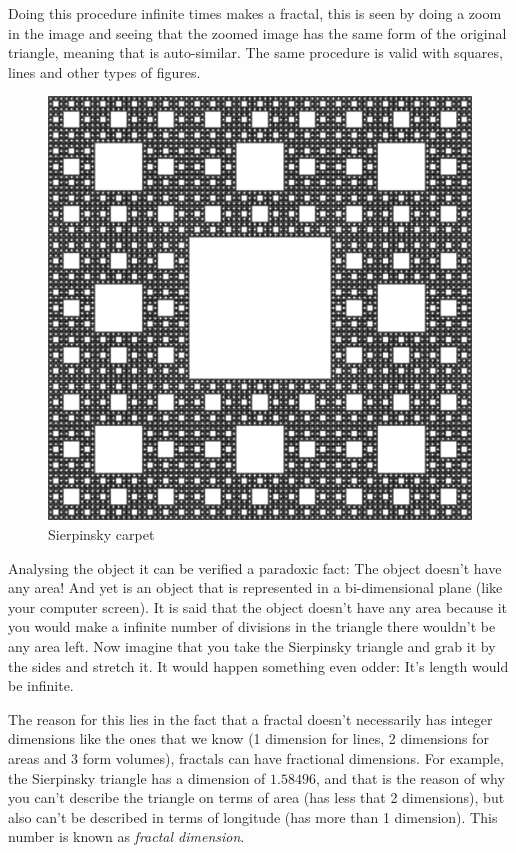\documentclass[oneside]{book}
\begin{document}
Doing this procedure infinite times makes a fractal, this is seen by doing a zoom in the image and seeing that the zoomed image has the same form of the original triangle, meaning that is auto-similar. The same procedure is valid with squares, lines and other types of figures.

\begin{figure}[h!]
	\centering
	\includegraphics[scale=0.25]{img/carpet.png}
	\caption{Sierpinsky carpet}
	\label{carpet}
\end{figure}

Analysing the object it can be verified a paradoxic fact: The object doesn't have any area! And yet is an object that is represented in a bi-dimensional plane (like your computer screen). It is said that the object doesn't have any area because it you would make a infinite number of divisions in the triangle there wouldn't be any area left. Now imagine that you take the Sierpinsky triangle and grab it by the sides and stretch it. It would happen something even odder: It's length would be infinite.

The reason for this lies in the fact that a fractal doesn't necessarily has integer dimensions like the ones that we know (1 dimension for lines, 2 dimensions for areas and 3 form volumes), fractals can have fractional dimensions. For example, the Sierpinsky triangle has a dimension of $1.58496$, and that is the reason of why you can't describe the triangle on terms of area (has less that 2 dimensions), but also can't be described in terms of longitude (has more than 1 dimension). This number is known as \textit{fractal dimension}.
\end{document}
